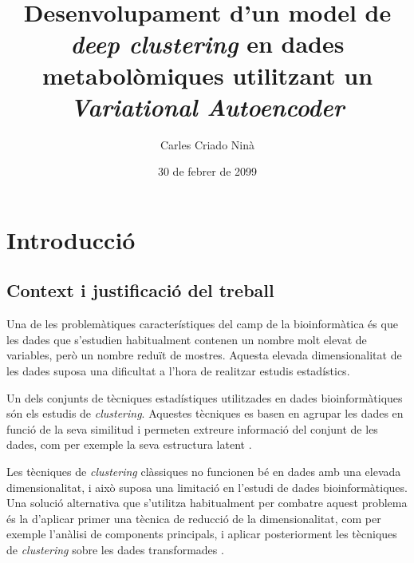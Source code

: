 \documentclass[CAT,BIB]{TFUOC}%
\title{Desenvolupament d'un model de \textit{deep clustering} en dades metabolòmiques utilitzant un \textit{Variational Autoencoder}}
\author{Carles Criado Ninà}
\date{30 de febrer de 2099}
\begin{document}
\estructura

\tableofcontents

\listoffigures

\listoftables




\chapter{Introducció}

    \section{Context i justificació del treball}

        Una de les problemàtiques característiques del camp de la bioinformàtica és que les dades que s'estudien habitualment contenen un nombre molt elevat de variables, però un nombre reduït de mostres. Aquesta elevada dimensionalitat de les dades suposa una dificultat a l'hora de realitzar estudis estadístics.

        Un dels conjunts de tècniques estadístiques utilitzades en dades bioinformàtiques són els estudis de \textit{clustering}. Aquestes tècniques es basen en agrupar les dades en funció de la seva similitud i permeten extreure informació del conjunt de les dades, com per exemple la seva estructura latent \citep{Karim2021, Masood2015}.

        Les tècniques de \textit{clustering} clàssiques no funcionen bé en dades amb una elevada dimensionalitat, i això suposa una limitació en l'estudi de dades bioinformàtiques. Una solució alternativa que s'utilitza habitualment per combatre aquest problema és la d'aplicar primer una tècnica de reducció de la dimensionalitat, com per exemple l'anàlisi de components principals, i aplicar posteriorment les tècniques de \textit{clustering} sobre les dades transformades \citep{Min2018, Masood2015}.
\end{document}
